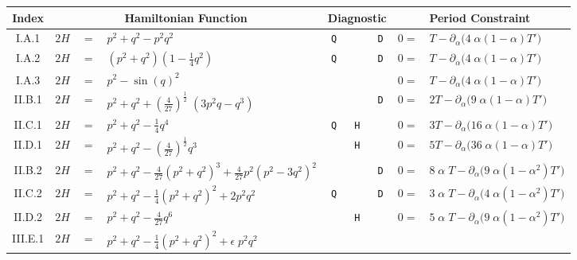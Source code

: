 \documentclass[nofootinbib,preprint]{revtex4-1}
\begin{document}
\begin{sidewaystable}[p]
\begin{center}
\label{tab:specimens}
\begin{tabularx}{\textwidth}{ c | c c l | c c c | r l  }
\hline \hline
\;\; Index \;\; & \multicolumn{3}{c|}{Hamiltonian Function} & 
\multicolumn{3}{c|}{Diagnostic}  & & \hspace{2cm} Period Constraint \hspace{3cm} \\
\hline 
I.A.1  & \;\;$2H$ & $=$  & $p^2+q^2-p^2 q^2$ & 
\;\;\texttt{Q}\;\; & \;\;\;\; & \;\;\texttt{D}\;\;& \;\;\; $0=$ & $T-\partial_{\alpha}\big(4\;\alpha(1-\alpha)T'\big)$ \\
I.A.2  & \;\;$2H$ & $=$  & $(p^2+q^2)(1-\frac{1}{4}q^2)$ & 
\;\;\texttt{Q}\;\; & \;\;\;\; & \;\;\texttt{D}\;\;& $0=$ & $T-\partial_{\alpha}\big(4\;\alpha(1-\alpha)T'\big)$  \\
I.A.3  & \;\;$2H$ & $=$  & $p^2-\sin(q)^2$& &  & & $0=$ & $T-\partial_{\alpha}\big(4\;\alpha(1-\alpha)T'\big)$  \\
\hline 
II.B.1 & \;\;$2H$ & $=$  & $p^2+q^2+(\frac{4}{27})^{\frac{1}{2}} \; ( 3 p^2 q- q^3) $ \;\;  & 
& & \;\;\texttt{D}\;\; & $0=$ &  $2T-\partial_{\alpha}\big(9\;\alpha(1-\alpha)T'\big)$    \\
II.C.1 & \;\;$2H$ & $=$  & $p^2+q^2 - \frac{1}{4}q^4 $&
\;\;\texttt{Q}\;\; & \;\;\texttt{H}\;\; & & $0=$ & $3T-\partial_{\alpha}\big(16\;\alpha(1-\alpha)T'\big)$     \\
II.D.1 & \;\;$2H$ & $=$  & $p^2+q^2 - (\frac{4}{27})^{\frac{1}{2}}q^3 $ & 
& \;\;\texttt{H}\;\; & & $0=$&   $5T-\partial_{\alpha}\big(36\;\alpha(1-\alpha)T'\big)$   \\
\hline
II.B.2 & \;\;$2H$ & $=$  & $p^2 + q^2 - \frac{4}{27} (p^2 + q^2)^3 +  \frac{4}{27} p^2 (p^2 - 3 q^2)^2$ \;\;\; &
 & & \;\;\texttt{D}\;\; & $0=$&  $8\;\alpha\;T-\partial_{\alpha}\big(9\;\alpha(1-\alpha^2)T'\big)$   \\
II.C.2 & \;\; $2H$ & $=$  & $p^2 + q^2  - \frac{1}{4}(p^2 + q^2)^2 +2 p^2 q^2$
\;\;& \;\;\texttt{Q}\;\; & & \;\;\texttt{D}\;\; & $0=$&  $3\;\alpha\;T-\partial_{\alpha}\big(4\;\alpha(1-\alpha^2)T'\big)$   \\
II.D.2 & \;\; $2H$ & $=$  &  $p^2 + q^2 - \frac{4}{27} q^6$ & 
& \;\;\texttt{H}\;\; & & $0=$& $5\;\alpha\;T-\partial_{\alpha}\big(9\;\alpha(1-\alpha^2)T'\big)$    \\
\hline 
III.E.1    & \;\;$2H$ & $=$  & $ p^2 + q^2 - \frac{1}{4} (p^2 + q^2)^2 + \epsilon \; p^2 q^2  $ \;\; & 

\end{tabularx}
\end{center}
\end{sidewaystable}
\end{document}
